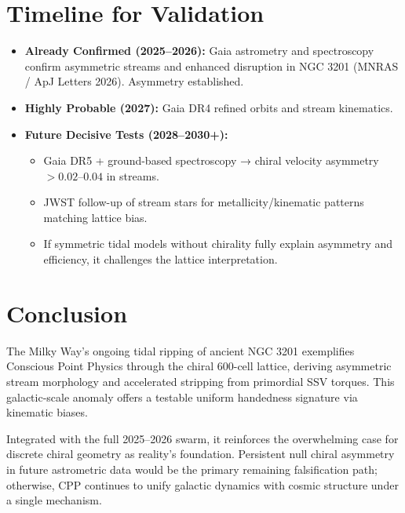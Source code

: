\documentclass[11pt]{article}
\begin{document}
\section{Timeline for Validation}
\begin{itemize}
    \item \textbf{Already Confirmed (2025--2026):} Gaia astrometry and spectroscopy confirm asymmetric streams and enhanced disruption in NGC 3201 (MNRAS / ApJ Letters 2026). Asymmetry established.
    \item \textbf{Highly Probable (2027):} Gaia DR4 refined orbits and stream kinematics.
    \item \textbf{Future Decisive Tests (2028--2030+):}
    \begin{itemize}
        \item Gaia DR5 + ground-based spectroscopy → chiral velocity asymmetry $>0.02$--$0.04$ in streams.
        \item JWST follow-up of stream stars for metallicity/kinematic patterns matching lattice bias.
        \item If symmetric tidal models without chirality fully explain asymmetry and efficiency, it challenges the lattice interpretation.
    \end{itemize}
\end{itemize}

\section{Conclusion}
The Milky Way's ongoing tidal ripping of ancient NGC 3201 exemplifies Conscious Point Physics through the chiral 600-cell lattice, deriving asymmetric stream morphology and accelerated stripping from primordial SSV torques. This galactic-scale anomaly offers a testable uniform handedness signature via kinematic biases.  

Integrated with the full 2025--2026 swarm, it reinforces the overwhelming case for discrete chiral geometry as reality's foundation. Persistent null chiral asymmetry in future astrometric data would be the primary remaining falsification path; otherwise, CPP continues to unify galactic dynamics with cosmic structure under a single mechanism.
\end{document}
